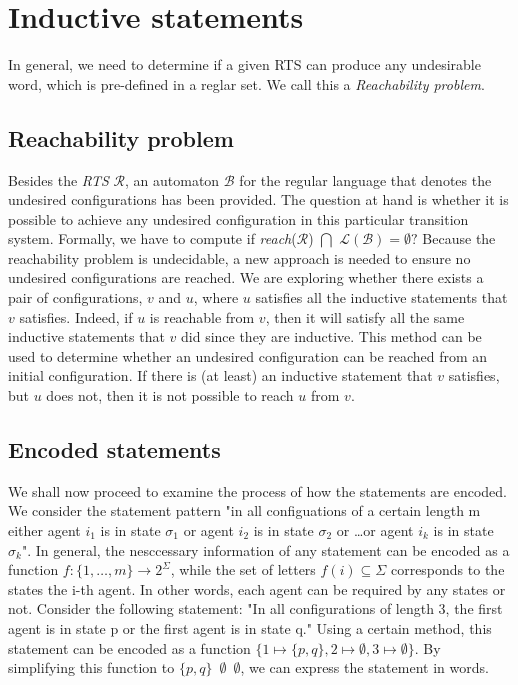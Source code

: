 \section{Inductive statements}\label{section:inductive_statements}
In general, we need to determine if a given RTS can produce any undesirable word,
which is pre-defined in a reglar set.
We call this a \textit{Reachability problem}.
\subsection*{Reachability problem}
Besides the \textit{RTS} $\mathcal{R}$, an automaton $\mathcal{B}$ for the regular language that denotes the undesired configurations has been provided.
The question at hand is whether it is possible to achieve any undesired configuration in this particular transition system.
Formally, we have to compute
if \textit{reach}($\mathcal{R}$)
$\bigcap$ $\mathcal{L}(\mathcal{B}) = \emptyset?$
Because the reachability problem is undecidable, a new approach is needed to 
ensure no undesired configurations are reached.
We are exploring whether there exists a pair of configurations, $v$ and $u$, 
where $u$ satisfies all the inductive statements that $v$ satisfies. 
Indeed, if $u$ is reachable from $v$, then it will satisfy all the same inductive statements that $v$ did since they are inductive.
This method can be used to determine whether an undesired configuration can be reached 
from an initial configuration. 
If there is (at least) an inductive statement that $v$ satisfies, but $u$ does not, then it is not possible to reach $u$ from $v$.

\subsection*{Encoded statements}
We shall now proceed to examine the process of how the statements are encoded.
We consider the statement pattern "in all configuations of a certain length
m either agent $i_1$ is in state $\sigma_1$ or agent $i_2$ is in state
$\sigma_2$ or \dots or agent $i_k$ is in state $\sigma_k$".
In general, the nesccessary information of any statement can be encoded
as a function $f: \lbrace 1, \dots, m\rbrace \rightarrow 2^{\Sigma}$, 
while the set of letters $f(i) \subseteq \Sigma$ corresponds to the states the i-th 
agent. In other words, each agent can be  required by any states or not.
Consider the following statement: "In all configurations of length 3, 
the first agent is in state p or the first agent is in state q." 
Using a certain method, this statement can be encoded as a function 
$\lbrace 1 \mapsto \lbrace p,q \rbrace, 2 \mapsto \emptyset, 3 \mapsto \emptyset \rbrace$.
By simplifying this function to $\lbrace p,q \rbrace$  $\,\emptyset$ $\,\emptyset$, we can express the statement in words.

